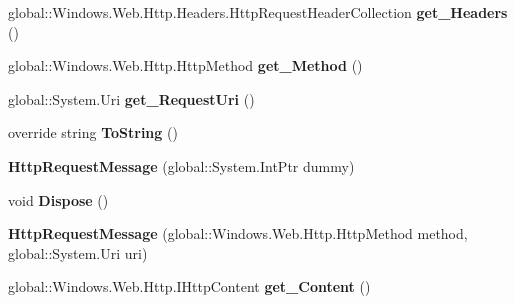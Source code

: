 \begin{DoxyCompactItemize}
global\+::\+Windows.\+Web.\+Http.\+Headers.\+Http\+Request\+Header\+Collection {\bfseries get\+\_\+\+Headers} ()
\item 
\mbox{\label{class_windows_1_1_web_1_1_http_1_1_http_request_message_a4e6485899f5654f598f0911225702f86}} 
global\+::\+Windows.\+Web.\+Http.\+Http\+Method {\bfseries get\+\_\+\+Method} ()
\item 
\mbox{\label{class_windows_1_1_web_1_1_http_1_1_http_request_message_a60eee69978be3f99e85a37b7bf05850d}} 
global\+::\+System.\+Uri {\bfseries get\+\_\+\+Request\+Uri} ()
\item 
\mbox{\label{class_windows_1_1_web_1_1_http_1_1_http_request_message_a311ec1966990d2a837636dfe734907f3}} 
override string {\bfseries To\+String} ()
\item 
\mbox{\label{class_windows_1_1_web_1_1_http_1_1_http_request_message_a266f73c079be0dd9c1b831b69dd1731e}} 
{\bfseries Http\+Request\+Message} (global\+::\+System.\+Int\+Ptr dummy)
\item 
\mbox{\label{class_windows_1_1_web_1_1_http_1_1_http_request_message_a45b7a3697d6f36e790546f21c5011670}} 
void {\bfseries Dispose} ()
\item 
\mbox{\label{class_windows_1_1_web_1_1_http_1_1_http_request_message_a59606adfc5f01047a058c7802520488d}} 
{\bfseries Http\+Request\+Message} (global\+::\+Windows.\+Web.\+Http.\+Http\+Method method, global\+::\+System.\+Uri uri)
\item 
\mbox{\label{class_windows_1_1_web_1_1_http_1_1_http_request_message_a2d95b5c161ea61544f6c82430b9bef3d}} 
global\+::\+Windows.\+Web.\+Http.\+I\+Http\+Content {\bfseries get\+\_\+\+Content} ()
\item 
\mbox{\label{class_windows_1_1_web_1_1_http_1_1_http_request_message_aef2c0a57c9fe364d410c4ea568aa1406}} 

\end{DoxyCompactItemize}
